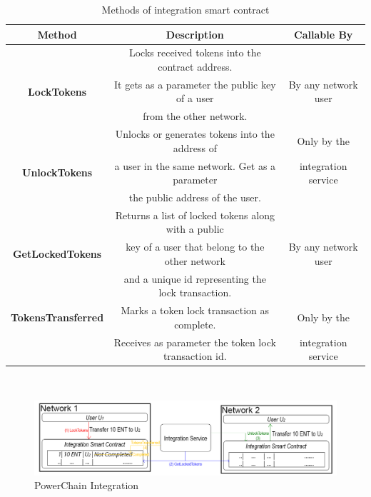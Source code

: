 \begin{table}[h!]
\begin{tabular}{c|c|c}
    \textbf{Method}            & \textbf{Description}                                 & \textbf{Callable By} \\
    \hline
                               & Locks received tokens into the contract address.     &                      \\
    \textbf{LockTokens}        & It gets as a parameter the public key of a user      & By any network user  \\
                               & from the other network.                              &                      \\
    \hline
                               & Unlocks or generates tokens into the address of      & Only by the          \\
    \textbf{UnlockTokens}      & a user in the same network. Get as a parameter       & integration service  \\
                               & the public address of the user.                      &                      \\
    \hline
                               & Returns a list of locked tokens along with a public  &                      \\
    \textbf{GetLockedTokens}   & key of a user that belong to the other network       & By any network user  \\
                               & and a unique id representing the lock transaction.   &                      \\
    \hline
    \textbf{TokensTransferred} & Marks a token lock transaction as complete.          & Only by the          \\
                               & Receives as parameter the token lock transaction id. & integration service  \\
\end{tabular}\\
\caption{Methods of integration smart contract}
\end{table}
\begin{figure}[h!]
    \centering
    \includegraphics[scale=0.35]{Figures/PowerChain_Integration.png}
    \caption{PowerChain Integration}
\end{figure}
